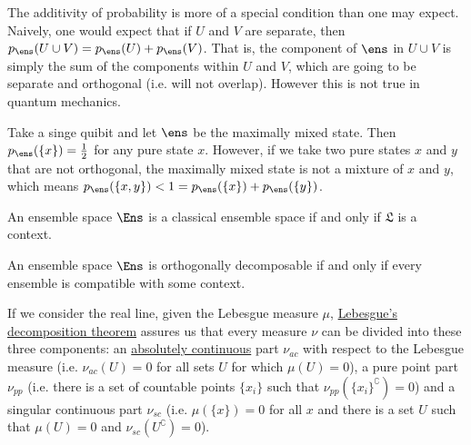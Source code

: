 \begin{remark}
	The additivity of probability is more of a special condition than one may expect. Naively, one would expect that if $U$ and $V$ are separate, then $p_{\ens}(U \cup V) = p_{\ens}(U) + p_{\ens}(V)$. That is, the component of $\ens$ in $U \cup V$ is simply the sum of the components within $U$ and $V$, which are going to be separate and orthogonal (i.e. will not overlap). However this is not true in quantum mechanics.
	
	Take a singe quibit and let $\ens$ be the maximally mixed state. Then $p_{\ens}(\{x\}) = \frac{1}{2}$ for any pure state $x$. However, if we take two pure states $x$ and $y$ that are not orthogonal, the maximally mixed state is not a mixture of $x$ and $y$, which means $p_{\ens}(\{x, y\}) < 1 = p_{\ens}(\{x\}) + p_{\ens}(\{y\})$.
\end{remark}

\begin{conj}
	An ensemble space $\Ens$ is a classical ensemble space if and only if $\mathfrak{L}$ is a context.
\end{conj}

\begin{conj}
	An ensemble space $\Ens$ is orthogonally decomposable if and only if every ensemble is compatible with some context.
\end{conj}


If we consider the real line, given the Lebesgue measure $\mu$, \href{https://en.wikipedia.org/wiki/Lebesgue%27s_decomposition_theorem}{Lebesgue's decomposition theorem} assures us that every measure $\nu$ can be divided into these three components: an \href{https://en.wikipedia.org/wiki/Absolute_continuity#Absolute_continuity_of_measures}{absolutely continuous} part $\nu_{ac}$ with respect to the Lebesgue measure (i.e. $\nu_{ac}(U)=0$ for all sets $U$ for which $\mu(U)=0$), a pure point part $\nu_{pp}$ (i.e. there is a set of countable points $\{x_i\}$ such that $\nu_{pp}(\{x_i\}^{\complement})=0$) and a singular continuous part $\nu_{sc}$ (i.e. $\mu(\{x\})=0$ for all $x$ and there is a set $U$ such that $\mu(U)=0$ and $\nu_{sc}(U^{\complement})=0$).

